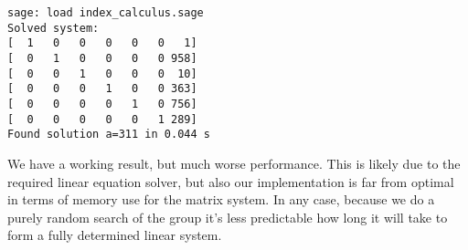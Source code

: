 \documentclass{article}
\begin{document}
\begin{verbatim}
sage: load index_calculus.sage
Solved system:
[  1   0   0   0   0   0   1]
[  0   1   0   0   0   0 958]
[  0   0   1   0   0   0  10]
[  0   0   0   1   0   0 363]
[  0   0   0   0   1   0 756]
[  0   0   0   0   0   1 289]
Found solution a=311 in 0.044 s
\end{verbatim}

We have a working result, but much worse performance.
This is likely due to the required linear equation solver, but also our implementation is far from optimal in terms of memory use for the matrix system.
In any case, because we do a purely random search of the group it's less predictable how long it will take to form a fully determined linear system.
\end{document}
